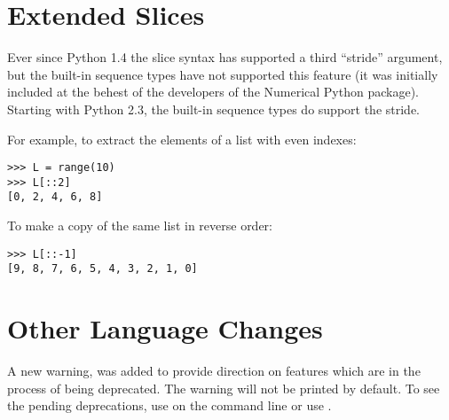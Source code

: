 \documentclass{howto}
\begin{document}
\begin{seealso}


\end{seealso}

\section{Extended Slices\label{extended-slices}}

Ever since Python 1.4 the slice syntax has supported a third
``stride'' argument, but the built-in sequence types have not
supported this feature (it was initially included at the behest of the
developers of the Numerical Python package).  Starting with Python
2.3, the built-in sequence types do support the stride.

For example, to extract the elements of a list with even indexes:

\begin{verbatim}
>>> L = range(10)
>>> L[::2]
[0, 2, 4, 6, 8]
\end{verbatim}

To make a copy of the same list in reverse order:

\begin{verbatim}
>>> L[::-1]
[9, 8, 7, 6, 5, 4, 3, 2, 1, 0]
\end{verbatim}

\section{Other Language Changes}






A new warning,  was added to
provide direction on features which are in the process of being
deprecated.  The warning will not be printed by default.  To see the
pending deprecations, use
 on the command line
or use .
\end{document}
